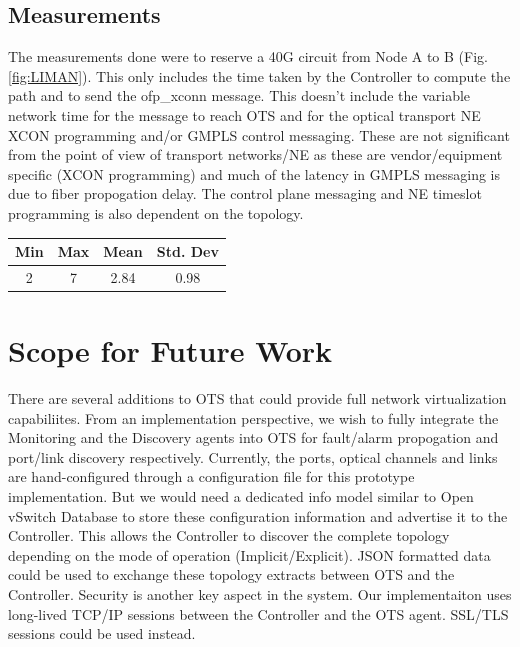 \documentclass{sig-alternate-10pt}
\begin{document}
	\subsection{Measurements}
	\label{sec:measure}
	The measurements done were to reserve a 40G circuit from Node A to B (Fig. \ref{fig:LIMAN}). This only includes the time 
	taken by the Controller to compute the path and to send the ofp\_xconn message. This doesn't include the variable
	network time for the message to reach OTS and for the optical transport NE XCON programming and/or GMPLS control
	messaging. These are not significant from the point of view of transport networks/NE as these are vendor/equipment
	specific (XCON programming) and much of the latency in GMPLS messaging is due to fiber propogation delay. The control
	plane messaging and NE timeslot programming is also dependent on the topology.

	\begin{center}
		\begin{tabular} { |  c | c | c | c | }
			\hline
			 Min & Max & Mean & Std. Dev \\ \hline
			2	 & 7 & 2.84 & 0.98 \\
			\hline
		\end{tabular}
		\label{measurements}
	\end{center}

	

\section{Scope for Future Work}
\label{sec:future}
	There are several additions to OTS that could provide full network virtualization capabiliites. From an
	implementation perspective, we wish to fully integrate the Monitoring and the Discovery agents into
	OTS for fault/alarm propogation and port/link discovery respectively. Currently, the ports, optical 
	channels and links are hand-configured through a configuration file for this prototype implementation.
	But we would need a dedicated info model similar to Open vSwitch Database \cite{ovsdb} to store
	these configuration information and advertise it to the Controller. This allows the Controller to discover
	the complete topology depending on the mode of operation (Implicit/Explicit). JSON formatted data 
	could be used to exchange these topology extracts between OTS and the Controller. Security is another
	key aspect in the system. Our implementaiton uses long-lived TCP/IP sessions between the Controller
	and the OTS agent. SSL/TLS sessions could be used instead.
\end{document}
